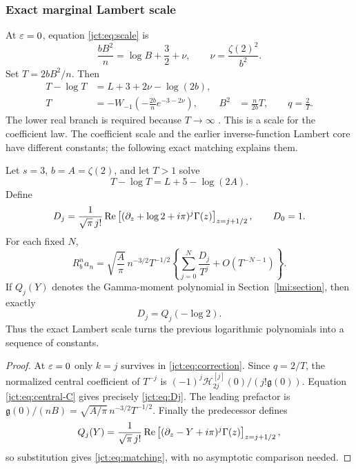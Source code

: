 \subsubsection{Exact marginal Lambert scale}

At $\varepsilon=0$, equation \eqref{jct:eq:scale} is
\[
 \frac{bB^2}{n}=\log B+\frac32+\nu,
 \qquad \nu=\frac{\zeta(2)^2}{b^2}.
\]
Set $T=2bB^2/n$. Then
\begin{align}
 T-\log T&=L+3+2\nu-\log(2b),\label{jct:eq:Lambert-scale}\\
 T&=-W_{-1}\left(-\frac{2b}{n}e^{-3-2\nu}\right),
 &B^2&=\frac n{2b}T,\qquad q=\frac2T.
       \label{jct:eq:Lambert-explicit}
\end{align}
The lower real branch is required because $T\to\infty$
\cite{lmi:lambert}. This is a scale for the coefficient law.
The coefficient scale and the earlier inverse-function Lambert core
have different constants; the following exact matching explains them.

\begin{corollary}
\label{jct:cor:marginal}
Let $s=3$, $b=A=\zeta(2)$, and let $T>1$ solve
\begin{equation}\label{jct:eq:critical-T}
 T-\log T=L+5-\log(2A).
\end{equation}
Define
\begin{equation}\label{jct:eq:Dj}
 D_j=\frac1{\sqrt\pi\,j!}
   \operatorname{Re}\left[(\partial_z+\log2+i\pi)^j\Gamma(z)
                                  \right]_{z=j+1/2},
 \qquad D_0=1.
\end{equation}
For each fixed $N$,
\begin{equation}\label{jct:eq:marginal-T-series}
 R_b^n a_n=\sqrt{\frac A\pi}\,n^{-3/2}T^{-1/2}
       \left\{\sum_{j=0}^N\frac{D_j}{T^j}
                     +O(T^{-N-1})\right\}.
\end{equation}
If $Q_j(Y)$ denotes the Gamma-moment polynomial in
Section~\ref{lmi:section}, then exactly
\begin{equation}\label{jct:eq:matching}
 D_j=Q_j(-\log2).
\end{equation}
Thus the exact Lambert scale turns the previous logarithmic
polynomials into a sequence of constants.
\end{corollary}

\begin{proof}
At $\varepsilon=0$ only $k=j$ survives in \eqref{jct:eq:correction}.
Since $q=2/T$, the normalized central coefficient of $T^{-j}$ is
$(-1)^j\mathcal{H}_{2j}^{[j]}(0)/(j!\mathfrak{g}(0))$.
Equation \eqref{jct:eq:central-C} gives precisely \eqref{jct:eq:Dj}.
The leading prefactor is
$\mathfrak{g}(0)/(nB)=\sqrt{A/\pi}\,n^{-3/2}T^{-1/2}$.
Finally the predecessor defines
\[
 Q_j(Y)=\frac1{\sqrt\pi\,j!}\operatorname{Re}\left[
             (\partial_z-Y+i\pi)^j\Gamma(z)
                                  \right]_{z=j+1/2},
\]
so substitution gives \eqref{jct:eq:matching}, with no asymptotic
comparison needed.
\end{proof}

